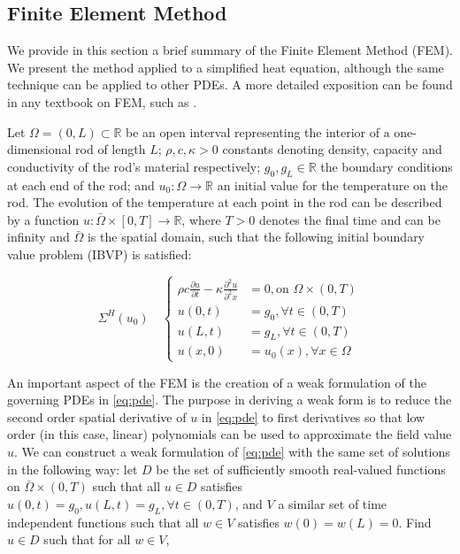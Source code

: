 \documentclass[oribibl]{llncs/llncs}
\newcommand*{\R}{\mathbb{R}}
\begin{document}
\subsection{Finite Element Method}
\label{sec:heat_equation_and_finite_element_analysis}

We provide in this section a brief summary of the Finite Element Method (FEM).
We present the method applied
to a simplified heat equation, although the same technique can be applied to other
PDEs. A more detailed exposition can be found in any
textbook on FEM, such as \cite{hughes_finite_2012-1}.

Let $\Omega = (0, L) \subset \R$ be an open interval representing the interior
of a one-dimensional rod of length $L$; $\rho, c, \kappa > 0$ 
constants denoting density, capacity and conductivity of the rod's material respectively;
$g_0, g_L \in \R$ the boundary conditions at each end of the rod; and $u_0 :
\Omega \rightarrow \R$ an initial value for the temperature on the rod. 
The evolution of the temperature at
each point in the rod can be described by a function $u : \bar \Omega \times [0,
T] \rightarrow \R$, where $T > 0$ denotes the final time and can be infinity and
$\bar \Omega$ is the spatial domain, such that the following initial boundary
value problem (IBVP) is satisfied:

\begin{equation}\label{eq:pde}
    \Sigma^{H}(u_0) \quad \left \{
    \begin{aligned}
        \rho c \frac{\partial u}{\partial t} - \kappa \frac{\partial^2
        u}{\partial^2 x} &= 0, \text{on } \Omega \times (0, T) \\
        u(0, t) &= g_0, \forall t \in (0, T) \\
        u(L, t) &= g_L, \forall t \in (0, T) \\
        u(x, 0) &= u_0(x), \forall x \in \Omega
    \end{aligned}
    \right.
\end{equation}

An important aspect of the FEM is the creation of a weak formulation of the
governing PDEs in \cref{eq:pde}. The purpose in deriving a weak form is to
reduce the second order spatial derivative of $u$ in \cref{eq:pde} to first
derivatives so that low order (in this case, linear) polynomials can be used to
approximate the field value $u$. We can construct a weak formulation of \cref{eq:pde} with the same set of
solutions in the following way: let $D$ be the set of sufficiently smooth 
real-valued functions on $\bar{\Omega} \times (0, T)$ such that all 
$u \in D$ satisfies $u(0, t) = g_0, u(L, t) = g_L, \forall t \in (0, T)$, 
and $V$ a similar set of time
independent functions such that all $w \in V$ satisfies $w(0) = w(L) = 0$. 
Find $u \in D$ such that for all $w \in V$,
\end{document}
